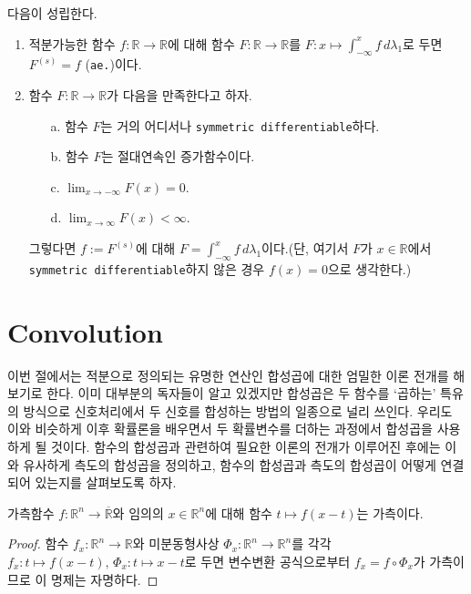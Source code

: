 \begin{theorem}
    다음이 성립한다.
    \begin{enumerate}
        \item 적분가능한 함수 $f:\mathbb{R}\to\mathbb{R}$에 대해 함수 $F:\mathbb{R}\to\mathbb{R}$를 $F:x\mapsto\int_{-\infty}^xf\,d\lambda_1$로 두면 $F^{(s)}=f$ (\texttt{ae.})이다.
        \item 함수 $F:\mathbb{R}\to\mathbb{R}$가 다음을 만족한다고 하자.
        \begin{enumerate}
            \item[a.] 함수 $F$는 거의 어디서나 \texttt{symmetric differentiable}하다.
            \item[b.] 함수 $F$는 절대연속인 증가함수이다.
            \item[c.] $\lim_{x\to-\infty}F(x)=0$.
            \item[d.] $\lim_{x\to\infty}F(x)<\infty$.
        \end{enumerate}
        그렇다면 $f:=F^{(s)}$에 대해 $F=\int_{-\infty}^xf\,d\lambda_1$이다.(단, 여기서 $F$가 $x\in\mathbb{R}$에서 \texttt{symmetric differentiable}하지 않은 경우 $f(x)=0$으로 생각한다.)
    \end{enumerate}
\end{theorem}

\section{Convolution}

이번 절에서는 적분으로 정의되는 유명한 연산인 합성곱에 대한 엄밀한 이론 전개를 해 보기로 한다. 이미 대부분의 독자들이 알고 있겠지만 합성곱은 두 함수를 `곱하는' 특유의 방식으로 신호처리에서 두 신호를 합성하는 방법의 일종으로 널리 쓰인다. 우리도 이와 비슷하게 이후 확률론을 배우면서 두 확률변수를 더하는 과정에서 합성곱을 사용하게 될 것이다. 함수의 합성곱과 관련하여 필요한 이론의 전개가 이루어진 후에는 이와 유사하게 측도의 합성곱을 정의하고, 함수의 합성곱과 측도의 합성곱이 어떻게 연결되어 있는지를 살펴보도록 하자.

\begin{proposition}\label{prop:convolutionMeasurable}
    가측함수 $f:\mathbb{R}^n\to\overline{\mathbb{R}}$와 임의의 $x\in\mathbb{R}^n$에 대해 함수 $t\mapsto f(x-t)$는 가측이다.
\end{proposition}

\begin{proof}
    함수 $f_x:\mathbb{R}^n\to\mathbb{R}$와 미분동형사상 $\Phi_x:\mathbb{R}^n\to\mathbb{R}^n$를 각각 $f_x:t\mapsto f(x-t),\,\Phi_x:t\mapsto x-t$로 두면 변수변환 공식으로부터 $f_x=f\circ\Phi_x$가 가측이므로 이 명제는 자명하다.
\end{proof}

